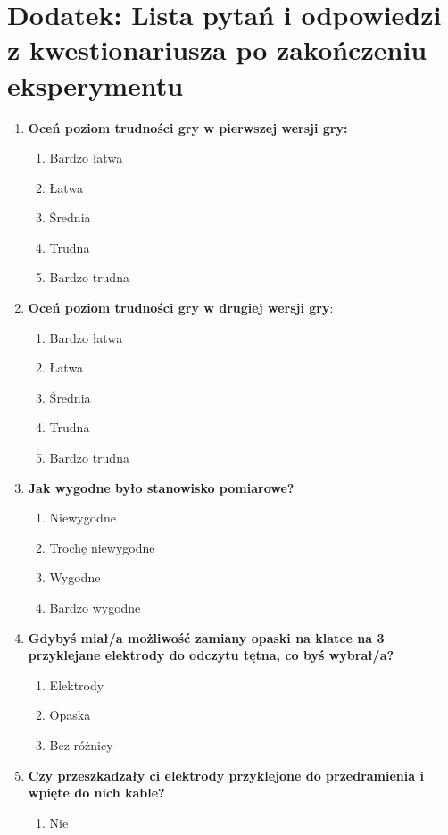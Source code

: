 \chapter{Dodatek: Lista pytań i odpowiedzi z kwestionariusza po zakończeniu eksperymentu}
\label{cha:questionary_questions}

\begin{enumerate}
	\item \textbf{Oceń poziom trudności gry w pierwszej wersji gry:}
	\begin{enumerate}[label=(\alph*)]
		\item Bardzo łatwa
		\item Łatwa
		\item Średnia
		\item Trudna
		\item Bardzo trudna
	\end{enumerate}
	\item \textbf{Oceń poziom trudności gry w drugiej wersji gry}:
	\begin{enumerate}[label=(\alph*)]
		\item Bardzo łatwa
		\item Łatwa
		\item Średnia
		\item Trudna
		\item Bardzo trudna
	\end{enumerate}
	\item \textbf{Jak wygodne było stanowisko pomiarowe?}
	\begin{enumerate}[label=(\alph*)]
		\item Niewygodne
		\item Trochę niewygodne
		\item Wygodne
		\item Bardzo wygodne
	\end{enumerate}
	\item \textbf{Gdybyś miał/a możliwość zamiany opaski na klatce na 3 przyklejane elektrody do odczytu tętna, co byś wybrał/a?}
	\begin{enumerate}[label=(\alph*)]
		\item Elektrody
		\item Opaska
		\item Bez różnicy
	\end{enumerate}
	\item \textbf{Czy przeszkadzały ci elektrody przyklejone do przedramienia i wpięte do nich kable?}
	\begin{enumerate}[label=(\alph*)]
		\item Nie

\end{enumerate}
\end{enumerate}
